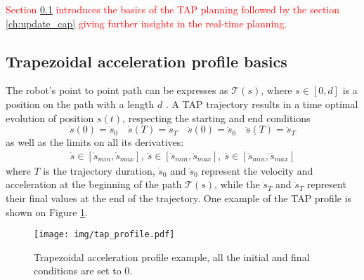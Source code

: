 \textcolor{red}{ Section \ref{ch:tap} introduces the basics of the TAP planning followed by the section \ref{ch:update_cap} giving further insights in the real-time planning. }


\subsection{Trapezoidal acceleration profile basics}\label{ch:tap}

The robot's point to point path can be expresses as $\mathcal{T}(s)$, where $s\in\left[0,d\right]$ is a position on the path with a length $d$ \cite{Constantinescu2000,Pfeiffer1987}. A TAP trajectory results in a time optimal evolution of position $s(t)$, respecting the starting and end conditions 
\begin{equation}
    \dot{s}(0) = \dot{s}_{0} \quad \dot{s}(T) = \dot{s}_{T} \quad
    \ddot{s}(0) = \ddot{s}_{0} \quad \ddot{s}(T) = \ddot{s}_{T}
\end{equation}
as well as the limits on all its derivatives:
\begin{equation}
\begin{split}
    \dot{s}\! \in\! [\dot{s}_{min}, \dot{s}_{max}], ~
\ddot{s}\!\in\! [\ddot{s}_{min}, \ddot{s}_{max}],~ 
\dddot{s}\!\in\! [\!\dddot{s\!}_{min}, \dddot{s\!}_{max}] 
\end{split}\label{eq:s_limits}
\end{equation}
where $T$ is the trajectory duration, $\dot{s}_{0}$ and $\ddot{s}_{0}$ represent the velocity and acceleration at the beginning of the path $\mathcal{T}(s)$, while the $\dot{s}_{T}$ and $\ddot{s}_{T}$ represent their final values at the end of the trajectory. One example of the TAP profile is shown on Figure \ref{fig:tap_profile}.


\begin{figure}
    \centering
    \texttt{[image: img/tap\_profile.pdf]}
    \caption{Trapezoidal acceleration profile example, all the initial and final conditions are set to 0.}
    \label{fig:tap_profile}
\end{figure}


